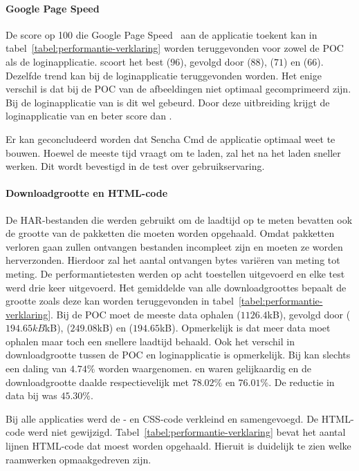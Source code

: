 \paragraph{Google Page Speed}
De score op 100 die Google Page Speed~\cite{Morgan2011} aan de applicatie toekent kan in tabel~\ref{tabel:performantie-verklaring} worden teruggevonden voor zowel de POC als de loginapplicatie.
\st{} scoort het best ($96$),  gevolgd door \lungo{} ($88$),  \jqm{}($71$) en \kendo{}($66$).
Dezelfde trend kan bij de loginapplicatie teruggevonden worden.
Het enige verschil is dat bij de POC van \kendo{} de afbeeldingen niet optimaal gecomprimeerd zijn.
Bij de loginapplicatie van \kendo{} is dit wel gebeurd.
Door deze uitbreiding krijgt de loginapplicatie van \kendo{} en beter score dan \jqm{}.

Er kan geconcludeerd worden dat Sencha Cmd de applicatie optimaal weet te bouwen.
Hoewel \st{} de meeste tijd vraagt om te laden, zal het na het laden sneller werken.
Dit wordt bevestigd in de test over gebruikservaring.

\paragraph{Downloadgrootte en HTML-code}
De HAR-bestanden die werden gebruikt om de laadtijd op te meten bevatten ook de grootte van de pakketten die moeten worden opgehaald.
Omdat pakketten verloren gaan zullen ontvangen bestanden incompleet zijn en moeten ze worden herverzonden. %
Hierdoor zal het aantal ontvangen bytes variëren van meting tot meting.
De performantietesten werden op acht toestellen uitgevoerd en elke test werd drie keer uitgevoerd.
Het gemiddelde van alle downloadgroottes bepaalt de grootte zoals deze kan worden teruggevonden in tabel~\ref{tabel:performantie-verklaring}.
Bij de POC moet \st{} de meeste data ophalen ($1126.4$kB),  gevolgd door \kendo{} ($194.65kB$kB), \lungo{} ($249.08$kB) en \jqm{} ($194.65$kB).
Opmerkelijk is dat \lungo{} meer data moet ophalen maar toch een snellere laadtijd behaald.
Ook het verschil in downloadgrootte tussen de POC en loginapplicatie is opmerkelijk.
Bij \jqm{} kan slechts een daling van $4.74\%$ worden waargenomen.
\st{} en \lungo{} waren gelijkaardig en de downloadgrootte daalde respectievelijk met $78.02\%$ en $76.01\%$.
De reductie in data bij \kendo{} was $45.30\%$.

Bij alle applicaties werd de \js{}- en CSS-code verkleind en samengevoegd.
De HTML-code werd niet gewijzigd.
Tabel~\ref{tabel:performantie-verklaring} bevat het aantal lijnen HTML-code dat moest worden opgehaald.
Hieruit is duidelijk te zien welke raamwerken opmaakgedreven zijn.
